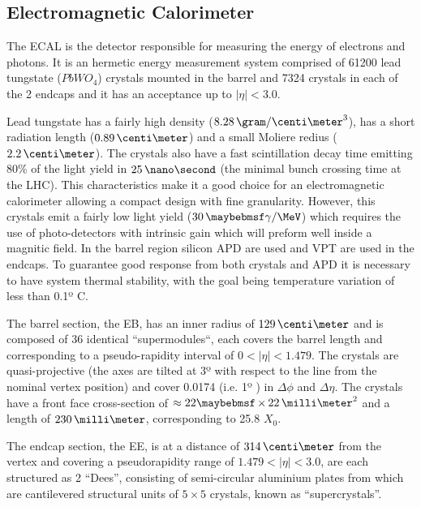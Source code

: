\subsection{Electromagnetic Calorimeter}
\label{SUBSECTION:ExperimentalApparatus_CMS_ECAL}


The \gls{ECAL} is the detector responsible for measuring the energy of electrons and photons. It is an hermetic energy measurement system comprised of 61200 lead tungstate ($PbWO_4$) crystals mounted in the barrel and 7324 crystals in each of the 2 endcaps and it has an acceptance up to $|\eta|<3.0$.

Lead tungstate has a fairly high density ($8.28\,\gram/\centi\meter^3$), has a short radiation length ($0.89\,\centi\meter$) and a small Moliere redius ($2.2\,\centi\meter$). The crystals also have a fast scintillation decay time emitting 80\% of the light yield in $25\,\nano\second$ (the minimal bunch crossing time at the \gls{LHC}). This characteristics make it a good choice for an electromagnetic calorimeter allowing a compact design with fine granularity. However, this crystals emit a fairly low light yield ($30\,\gamma/\MeV$) which requires the use of photo-detectors with intrinsic gain which will preform well inside a magnitic field. In the barrel region silicon \gls{APD} are used and \gls{VPT} are used in the endcaps. To guarantee good response from both crystals and \gls{APD} it is necessary to have system thermal stability, with the goal being temperature variation of less than 0.1º C.

The barrel section, the \gls{EB}, has an inner radius of $129\,\centi\meter$ and is composed of 36 identical ``supermodules``, each covers the barrel length and corresponding to a pseudo-rapidity interval of $0<|\eta|<1.479$. The crystals are quasi-projective (the axes are tilted at 3º with respect to the line from the nominal vertex position) and cover 0.0174 (i.e. 1º ) in $\Delta\phi$ and $\Delta\eta$. The crystals have a front face cross-section of $\approx 22 \times 22\,\milli\meter^2$ and a length of $230\,\milli\meter$, corresponding to 25.8 $X_0$.

The endcap section, the \gls{EE}, is at a distance of $314\,\centi\meter$ from the vertex and covering a pseudorapidity range of $1.479<|\eta|<3.0$, are each structured as 2 “Dees”, consisting of semi-circular aluminium plates from which are cantilevered structural units of $5\times 5$ crystals, known as “supercrystals”.

